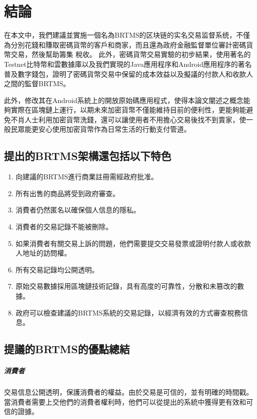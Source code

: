 
\chapter{結論}
在本文中，我們建議並實施一個名為BRTMS的区块链的实名交易监督系统，不僅為分別花錢和賺取密碼貨幣的客戶和商家，而且還為政府金融監督單位審計密碼貨幣交易，然後幫助籌集 稅收。 此外，密碼貨幣交易實驗的初步結果，使用著名的Testnet比特幣和雲數據庫以及我們實現的Java應用程序和Android應用程序的著名普及數字錢包，證明了密碼貨幣交易中保留的成本效益以及擬議的付款人和收款人之間的監督BRTMS。
	
此外，修改其在Android系統上的開放原始碼應用程式，使得本論文闡述之概念能夠實際在區塊鏈上運行，以期未來加密貨幣不僅能維持目前的便利性，更能夠能避免不肖人士利用加密貨幣洗錢，還可以讓使用者不用擔心交易後找不到賣家，使一般民眾能更安心使用加密貨幣作為日常生活的行動支付管道。

	\section{提出的BRTMS架構還包括以下特色}
		\begin{enumerate}
			\item 向建議的BRTMS進行商業註冊需經政府批准。
			\item 所有出售的商品將受到政府審查。
			\item 消費者仍然匿名以確保個人信息的隱私。
			\item 消費者的交易記錄不能被刪除。
			\item 如果消費者有關交易上訴的問題，他們需要提交交易發票或證明付款人或收款人地址的訪問權。
			\item 所有交易記錄均公開透明。
			\item 原始交易數據採用區塊鏈技術記錄，具有高度的可靠性，分散和未篡改的數據。
			\item 政府可以檢查建議的BRTMS系統的交易記錄，以經濟有效的方式審查稅務信息。
		\end{enumerate}

	\section{提議的BRTMS的優點總結}

		\paragraph{消費者}交易信息公開透明，保護消費者的權益。由於交易是可信的，並有明確的時間戳。當消費者需要上交他們的消費者權利時，他們可以從提出的系統中獲得更有效和可信的證據。
